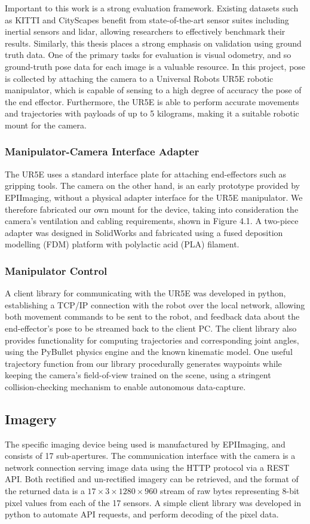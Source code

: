 Important to this work is a strong evaluation framework. Existing datasets such as KITTI and CityScapes benefit from state-of-the-art sensor suites including inertial sensors and lidar, allowing researchers to effectively benchmark their results. Similarly, this thesis places a strong emphasis on validation using ground truth data. One of the primary tasks for evaluation is visual odometry, and so ground-truth pose data for each image is a valuable resource. In this project, pose is collected by attaching the camera to a Universal Robots UR5E robotic manipulator, which is capable of sensing to a high degree of accuracy the pose of the end effector. Furthermore, the UR5E is able to perform accurate movements and trajectories with payloads of up to 5 kilograms, making it a suitable robotic mount for the camera. 

\subsubsection{Manipulator-Camera Interface Adapter}
The UR5E uses a standard interface plate for attaching end-effectors such as gripping tools. The camera on the other hand, is an early prototype provided by EPIImaging, without a physical adapter interface for the UR5E manipulator. We therefore fabricated our own mount for the device, taking into consideration the camera's ventilation and cabling requirements, shown in Figure 4.1. A two-piece adapter was designed in SolidWorks and fabricated using a fused deposition modelling (FDM) platform with polylactic acid (PLA) filament. 

\subsubsection{Manipulator Control}
A client library for communicating with the UR5E was developed in python, establishing a TCP/IP connection with the robot over the local network, allowing both movement commands to be sent to the robot, and feedback data about the end-effector's pose to be streamed back to the client PC. The client library also provides functionality for computing trajectories and corresponding joint angles, using the PyBullet \cite{pybullet2017} physics engine and the known kinematic model. One useful trajectory function from our library procedurally generates waypoints while keeping the camera's field-of-view trained on the scene, using a stringent collision-checking mechanism to enable autonomous data-capture. 

\subsection{Imagery}
The specific imaging device being used is manufactured by EPIImaging, and consists of 17 sub-apertures. The communication interface with the camera is a network connection serving image data using the HTTP protocol via a REST API. Both rectified and un-rectified imagery can be retrieved, and the format of the returned data is a $17\times 3 \times 1280 \times 960$ stream of raw bytes representing 8-bit pixel values from each of the 17 sensors. A simple client library was developed in python to automate API requests, and perform decoding of the pixel data.

